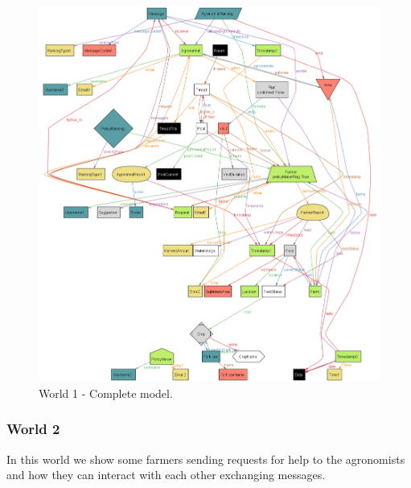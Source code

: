 \begin{figure}[H]
\centering
\includegraphics[width=\textwidth]{../AlloyCode/ExportWorldPNG/world1_all.png}
\caption{\label{fig:alloyExecution}World 1 - Complete model.}
\end{figure}

\subsubsection{World 2}
In this world we show some farmers sending requests for help to the agronomists and how they can interact with each other exchanging messages.

